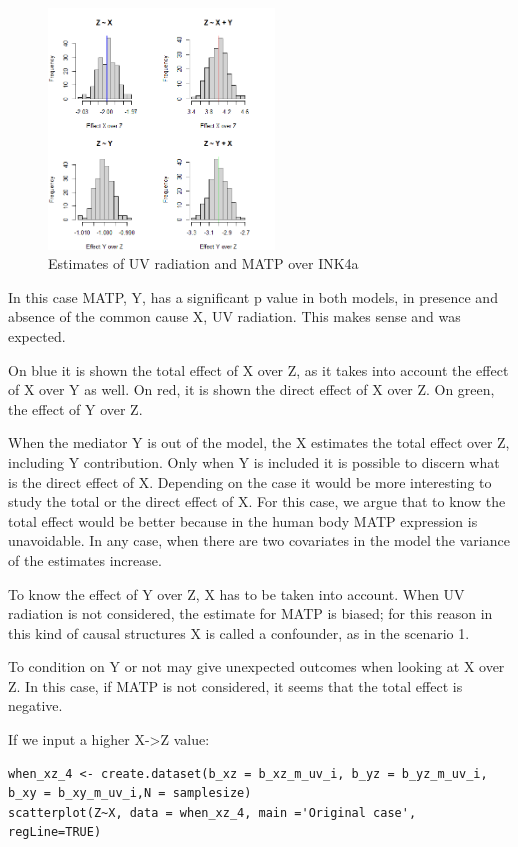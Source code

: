 \documentclass{article}
\begin{document}
\begin{figure}[h]
\caption{Estimates of UV radiation and MATP over INK4a}
\includegraphics[width=6cm]{histsc2.png}
\centering
\end{figure}

In this case MATP, Y, has a significant p value in both models, in presence and absence of the common cause X, UV radiation. This makes sense and was expected.\par
On blue it is shown the total effect of X over Z, as it takes into account the effect of X over Y as well. On red, it is shown the direct effect of X over Z. On green, the effect of Y over Z.\par
When the mediator Y is out of the model, the X estimates the total effect over Z, including Y contribution. Only when Y is included it is possible to discern what is the direct effect of X. Depending on the case it would be more interesting to study the total or the direct effect of X. For this case, we argue that to know the total effect would be better because in the human body MATP expression is unavoidable. In any case, when there are two covariates in the model the variance of the estimates increase.\par
To know the effect of Y over Z, X has to be taken into account. When UV radiation is not considered, the estimate for MATP is biased; for this reason in this kind of causal structures X is called a confounder, as in the scenario 1. \par
To condition on Y or not may give unexpected outcomes when looking at X over Z. In this case, if MATP is not considered, it seems that the total effect is negative.\par
If we input a higher X->Z value:\par
\begin{lstlisting}
when_xz_4 <- create.dataset(b_xz = b_xz_m_uv_i, b_yz = b_yz_m_uv_i, b_xy = b_xy_m_uv_i,N = samplesize)
scatterplot(Z~X, data = when_xz_4, main ='Original case', regLine=TRUE)
\end{lstlisting}
\end{document}
